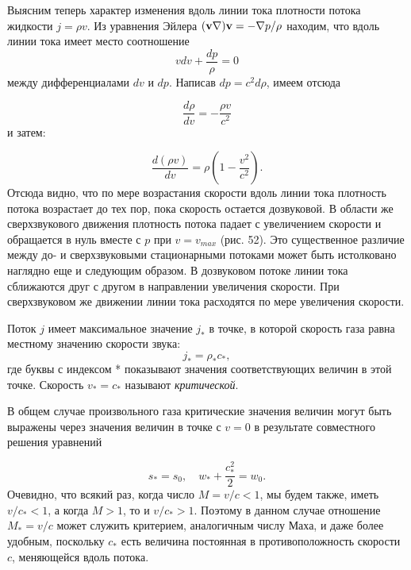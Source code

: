 Выясним теперь характер изменения вдоль линии тока плотности потока жидкости $j = \rho v$.
Из уравнения Эйлера $({\mathbf{v}} \nabla) {\mathbf{v}} = - \nabla p/\rho$ находим, что вдоль линии тока имеет место соотношение
\[
    vdv + \frac{dp}{\rho} = 0
\]
между дифференциалами $dv$ и $dp$. Написав $dp = c^2 d \rho$, имеем отсюда

\begin{equation}
    \label{eq:83.4}
    \frac{d \rho}{dv} = - \frac{\rho v}{c^2}
\end{equation}
и затем:

\begin{equation}
    \label{eq:83.5}
    \frac{d(\rho v)}{dv} = \rho \left( 1 - \frac{v^2}{c^2} \right).
\end{equation}
Отсюда видно, что по мере возрастания скорости вдоль линии тока плотность потока возрастает до тех пор, пока скорость остается дозвуковой.
В области же сверхзвукового движения плотность потока падает с увеличением скорости и обращается в нуль вместе с $p$ при $v = v_{max}$ (рис. 52).
Это существенное различие между до- и сверхзвуковыми стационарными потоками может быть истолковано наглядно еще и следующим образом.
В дозвуковом потоке линии тока сближаются друг с другом в направлении увеличения скорости.
При сверхзвуковом же движении линии тока расходятся по мере увеличения скорости.

Поток $j$ имеет максимальное значение $j_*$ в точке, в которой скорость газа равна местному значению скорости звука:
\begin{equation}
    \label{eq:83.6}
    j_* = \rho_* c_* ,
\end{equation}
где буквы с индексом * показывают значения соответствующих величин в этой точке.
Скорость $v_* = c_*$ называют \emph{критической}.

В общем случае произвольного газа критические значения величин могут быть выражены через значения величин в точке с $v = 0$ в результате совместного решения уравнений

\begin{equation}
    \label{eq:83.7}
    s_* = s_0, \quad w_* + \frac{c^2_*}{2} = w_0.
\end{equation}
Очевидно, что всякий раз, когда число $M = v/c < 1$, мы будем также, иметь $v/c_*<1$, а когда $M>1$, то и $v/c_* >1$.
Поэтому в данном случае отношение $M_* = v/c$ может служить критерием, аналогичным числу Маха, и даже более удобным, поскольку $c_*$ есть величина постоянная в противоположность скорости $c$, меняющейся вдоль потока.

